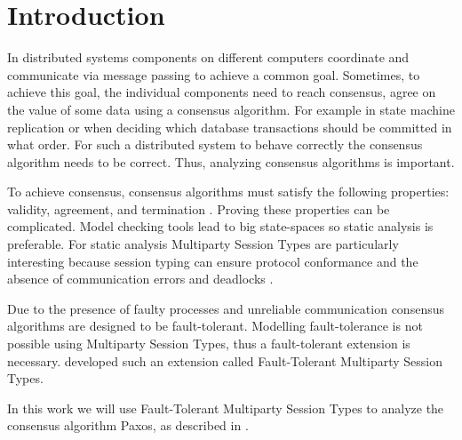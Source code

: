 \chapter{Introduction}
In distributed systems components on different computers coordinate and communicate via message passing to achieve a common goal.
Sometimes, to achieve this goal, the individual components need to reach consensus, \ie agree on the value of some data using a consensus algorithm.
For example in state machine replication or when deciding which database transactions should be committed in what order.
For such a distributed system to behave correctly the consensus algorithm needs to be correct.
Thus, analyzing consensus algorithms is important.

To achieve consensus, consensus algorithms must satisfy the following properties: validity, agreement, and termination \cite{CoulourisEtal01}.
Proving these properties can be complicated.
Model checking tools lead to big state-spaces so static analysis is preferable.
For static analysis Multiparty Session Types are particularly interesting because session typing can ensure protocol conformance and the absence of communication errors and deadlocks \cite{ScalasEtal18}.

Due to the presence of faulty processes and unreliable communication consensus algorithms are designed to be fault-tolerant.
Modelling fault-tolerance is not possible using Multiparty Session Types, thus a fault-tolerant extension is necessary.
\citeauthor{PetersEtal21} developed such an extension called Fault-Tolerant Multiparty Session Types.

In this work we will use Fault-Tolerant Multiparty Session Types to analyze the consensus algorithm Paxos, as described in \cite{Lamport01}.




